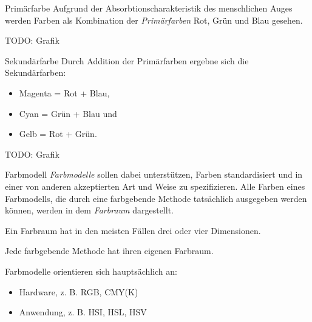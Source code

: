 \begin{defi}{Primärfarbe}
    Aufgrund der Absorbtionscharakteristik des menschlichen Auges werden Farben als Kombination der \emph{Primärfarben} Rot, Grün und Blau gesehen.

    TODO: Grafik
\end{defi}

\begin{defi}{Sekundärfarbe}
    Durch Addition der Primärfarben ergebne sich die Sekundärfarben:
    \begin{itemize}
        \item Magenta = Rot + Blau,
        \item Cyan = Grün + Blau und
        \item Gelb = Rot + Grün.
    \end{itemize}

    TODO: Grafik
\end{defi}

\begin{defi}{Farbmodell}
    \emph{Farbmodelle} sollen dabei unterstützen, Farben standardisiert und in einer von anderen akzeptierten Art und Weise zu spezifizieren.
    Alle Farben eines Farbmodells, die durch eine farbgebende Methode tatsächlich ausgegeben werden können, werden in dem \emph{Farbraum} dargestellt.

    Ein Farbraum hat in den meisten Fällen drei oder vier Dimensionen.

    Jede farbgebende Methode hat ihren eigenen Farbraum.

    Farbmodelle orientieren sich hauptsächlich an:
    \begin{itemize}
        \item Hardware, z. B. RGB, CMY(K)
        \item Anwendung, z. B. HSI, HSL, HSV
    \end{itemize}
\end{defi}

